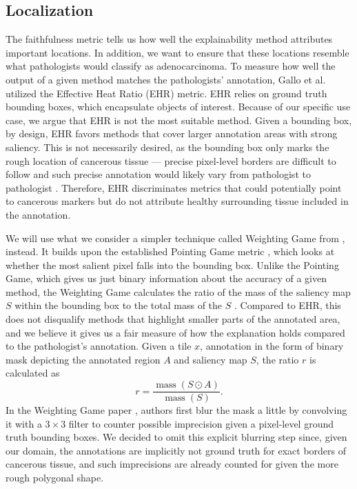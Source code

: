 \subsection*{Localization}

The faithfulness metric tells us how well the explainability method attributes important locations.
In addition, we want to ensure that these locations resemble what pathologists would classify as adenocarcinoma.
To measure how well the output of a given method matches the pathologists' annotation, Gallo et al. \cite{gallo} utilized the Effective Heat Ratio (EHR) \cite{ehr} metric.
EHR relies on ground truth bounding boxes, which encapsulate objects of interest.
Because of our specific use case, we argue that EHR is not the most suitable method.
Given a bounding box, by design, EHR favors methods that cover larger annotation areas with strong saliency.
This is not necessarily desired, as the bounding box only marks the rough location of cancerous tissue --- precise pixel-level borders are difficult to follow \cite{gallo, annotation-agreement} and such precise annotation would likely vary from pathologist to pathologist \cite{annotation-agreement}.
Therefore, EHR discriminates metrics that could potentially point to cancerous markers but do not attribute healthy surrounding tissue included in the annotation.

We will use what we consider a simpler technique called Weighting Game from \cite{weighting-game}, instead.
It builds upon the established Pointing Game metric \cite{pointing-game}, which looks at whether the most salient pixel falls into the bounding box.
Unlike the Pointing Game, which gives us just binary information about the accuracy of a given method, the Weighting Game calculates the ratio of the mass of the saliency map $S$ within the bounding box to the total mass of the $S$ \cite{weighting-game}.
Compared to EHR, this does not disqualify methods that highlight smaller parts of the annotated area, and we believe it gives us a fair measure of how the explanation holds compared to the pathologist's annotation.
Given a tile $x$, annotation in the form of binary mask depicting the annotated region $A$ and saliency map $S$, the ratio $r$ is calculated as
\begin{equation}\label{eq:wg}
    r = \frac{\operatorname{\text{mass}}(S \odot A)}{\operatorname{\text{mass}}(S)}.
\end{equation}
In the Weighting Game paper \cite{weighting-game}, authors first blur the mask a little by convolving it with a $3 \times 3$ filter to counter possible imprecision given a pixel-level ground truth bounding boxes.
We decided to omit this explicit blurring step since, given our domain, the annotations are implicitly not ground truth for exact borders of cancerous tissue, and such imprecisions are already counted for given the more rough polygonal shape.

